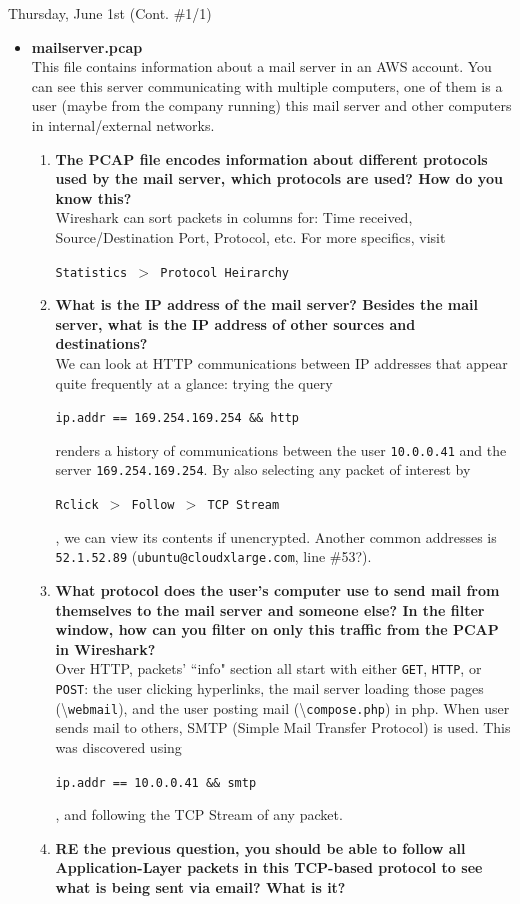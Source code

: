 \documentclass[11pt]{article}
\newcommand\codebox[1]{
    \noindent\hspace{-0.25em}\begin{tcolorbox}[on line, hbox, colback = codeblack, colframe = codeborder, coltext = white, boxrule = 1.5pt, left = 2pt, right = 2pt, top = 0.5pt, bottom = 0.5pt]
    \small\texttt{#1}\normalsize
    \end{tcolorbox}\hspace{-0.25em}
}
\begin{document}
\begin{bloodorangebox}{Thursday, June 1st (Cont. \#1/1)\vspace{-2.2em}\begin{flushright}\large {}\end{flushright}}
\begin{itemize}
    \item\LARGE\textbf{mailserver.pcap} \\
    \normalsize This file contains information about a mail server in an AWS account. You can see this server communicating with multiple computers, one of them is a user (maybe from the company running) this mail server and other computers in internal/external networks.
    \begin{enumerate}
    \item \textbf{The PCAP file encodes information about different protocols used by the mail server, which protocols are used? How do you know this?} \\

    \vspace{-1em}
    Wireshark can sort packets in columns for: Time received, Source/Destination Port, Protocol, etc. For more specifics, visit \codebox{Statistics $>$ Protocol Heirarchy}
    \item \textbf{What is the IP address of the mail server? Besides the mail server, what is the IP address of other sources and destinations?} \\

    \vspace{-1em}
    We can look at HTTP communications between IP addresses that appear quite frequently at a glance: trying the query \codebox{ip.addr == 169.254.169.254 \&\& http} renders a history of communications between the user \texttt{10.0.0.41} and the server \texttt{169.254.169.254}. By also selecting any packet of interest by \codebox{Rclick $>$ Follow $>$ TCP Stream}, we can view its contents if unencrypted. Another common addresses is \texttt{52.1.52.89} (\texttt{ubuntu@cloudxlarge.com}, line \#53?).
    \item \textbf{What protocol does the user's computer use to send mail from themselves to the mail server and someone else? In the filter window, how can you filter on only this traffic from the PCAP in Wireshark?} \\

    \vspace{-1em}
    Over HTTP, packets' ``info" section all start with either \texttt{GET}, \texttt{HTTP}, or \texttt{POST}: the user clicking hyperlinks, the mail server loading those pages (\textbackslash\texttt{webmail}), and the user posting mail (\textbackslash\texttt{compose.php}) in php. When user sends mail to others, SMTP (Simple Mail Transfer Protocol) is used. This was discovered using \codebox{ip.addr == 10.0.0.41 \&\& smtp}, and following the TCP Stream of any packet.
    \item \textbf{RE the previous question, you should be able to follow all Application-Layer packets in this TCP-based protocol to see what is being sent via email? What is it?} \\


\end{enumerate}
\end{itemize}
\end{bloodorangebox}
\end{document}
